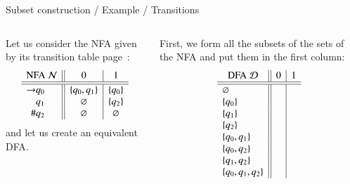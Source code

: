 %
\begin{frame}{Subset construction / Example / Transitions}

\begin{columns}

   Let us consider the NFA given by its
  transition table page~\pageref{nfa_01_suffix_table}:
  \[
  \begin{array}{r@{}l||c|c}
    \multicolumn{2}{c||}{\text{NFA} \; {\cal N}} & 0 & 1\\
    \hline\hline
    \rightarrow & q_0 & \{q_0, q_1\} & \{q_0\}\\
                & q_1 & \varnothing  & \{q_2\}\\
    \#          & q_2 & \varnothing  & \varnothing
  \end{array}
  \]
  and let us create an equivalent DFA.

   First, we form all the subsets of the sets of
  the NFA and put them in the first column:
  \[
  \begin{array}{r@{}l||c|c}
    \multicolumn{2}{c||}{\text{DFA} \; {\cal D}} & 0 & 1\\
    \hline\hline
    & \varnothing       & &\\
    & \{q_0\}           & &\\
    & \{q_1\}           & &\\
    & \{q_2\}           & &\\
    & \{q_0, q_1\}      & &\\
    & \{q_0, q_2\}      & &\\
    & \{q_1, q_2\}      & &\\
    & \{q_0, q_1, q_2\} & &
  \end{array}
  \]
\end{columns}

\end{frame}

